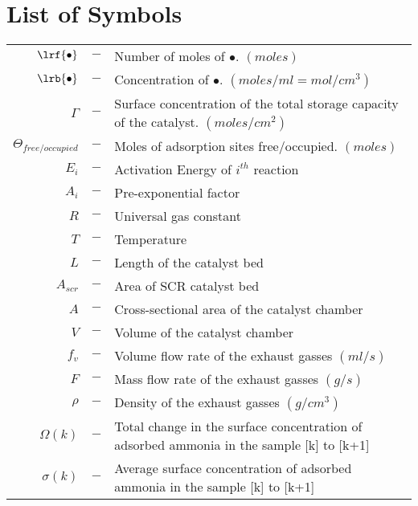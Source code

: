 \section*{List of Symbols}

\begin{table}[H]
    \begin{tabular}{r c l}
        $\lrf{\bullet}$ &$-$& Number of moles of $\bullet$. $(moles)$\\
        $\lrb{\bullet}$ &$-$& Concentration of $\bullet$. $(moles/ml = mol/cm^3)$\\
        $\Gamma$ &$-$& Surface concentration of the total storage capacity of the catalyst. $(moles/cm^2)$\\
        $\Theta_{free/occupied}$ &$-$& Moles of adsorption sites free/occupied. $(moles)$\\
        $E_i$ &$-$& Activation Energy of $i^{th}$ reaction\\
        $A_i$ &$-$& Pre-exponential factor\\
        $R$ &$-$& Universal gas constant\\
        $T$ &$-$& Temperature\\
        $L$ &$-$& Length of the catalyst bed\\
        $A_{scr}$ &$-$& Area of SCR catalyst bed\\
        $A$ &$-$& Cross-sectional area of the catalyst chamber\\
        $V$ &$-$& Volume of the catalyst chamber\\
        $f_v$ &$-$& Volume flow rate of the exhaust gasses $(ml/s)$\\
        $F$ &$-$& Mass flow rate of the exhaust gasses $(g/s)$\\
        $\rho$ &$-$& Density of the exhaust gasses $(g/cm^3)$\\
        $\Omega(k)$ &$-$& Total change in the surface concentration of adsorbed ammonia in the sample [k] to [k+1]\\
        $\sigma(k)$ &$-$& Average surface concentration of adsorbed ammonia in the sample [k] to [k+1]\\
    \end{tabular}
\end{table}

